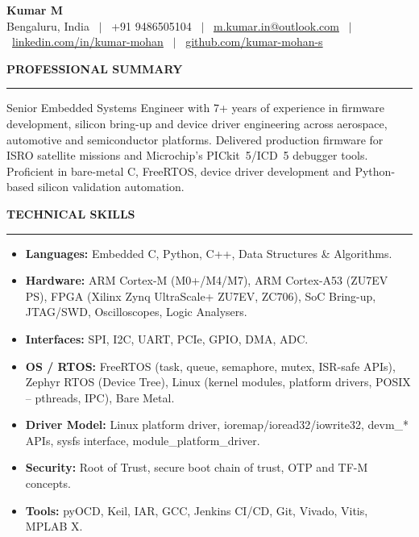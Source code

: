 \documentclass[11pt,a4paper]{article}
\newcommand{\resumesection}[1]{
    \vspace{1.2em} 
    {\large \textbf{\uppercase{#1}}}
    \vspace{0.2em}
    \hrule
    \vspace{0.6em} 
}
\begin{document}
\begin{center}
    {\Large \textbf{Kumar M}} \\ \vspace{0.4em}
    \small{Bengaluru, India \ $\vert$ \ +91 9486505104 \ $\vert$ \
    \href{mailto:m.kumar.in@outlook.com}{m.kumar.in@outlook.com} \ $\vert$ \
    \href{https://www.linkedin.com/in/kumar-mohan}{linkedin.com/in/kumar-mohan} \ $\vert$ \
    \href{https://github.com/kumar-mohan-s}{github.com/kumar-mohan-s}}
\end{center}

\resumesection{Professional Summary}
Senior Embedded Systems Engineer with 7+ years of experience in firmware development, silicon bring-up and device driver engineering across aerospace, automotive and semiconductor platforms. Delivered production firmware for ISRO satellite missions and Microchip's PICkit~5/ICD~5 debugger tools. Proficient in bare-metal C, FreeRTOS, device driver development and Python-based silicon validation automation.

\resumesection{Technical Skills}
\begin{itemize}[leftmargin=1.5em, itemsep=2pt, topsep=0pt]
    \item \textbf{Languages:} Embedded C, Python, C++, Data Structures \& Algorithms.
    \item \textbf{Hardware:} ARM Cortex-M (M0+/M4/M7), ARM Cortex-A53 (ZU7EV PS), FPGA (Xilinx Zynq UltraScale+ ZU7EV, ZC706), SoC Bring-up, JTAG/SWD, Oscilloscopes, Logic Analysers.
    \item \textbf{Interfaces:} SPI, I2C, UART, PCIe, GPIO, DMA, ADC.
    \item \textbf{OS / RTOS:} FreeRTOS (task, queue, semaphore, mutex, ISR-safe APIs), Zephyr RTOS (Device Tree), Linux (kernel modules, platform drivers, POSIX -- pthreads, IPC), Bare Metal.
    \item \textbf{Driver Model:} Linux platform driver, ioremap/ioread32/iowrite32, devm\_* APIs, sysfs interface, module\_platform\_driver.
    \item \textbf{Security:} Root of Trust, secure boot chain of trust, OTP and TF-M concepts.
    \item \textbf{Tools:} pyOCD, Keil, IAR, GCC, Jenkins CI/CD, Git, Vivado, Vitis, MPLAB X.
\end{itemize}
\end{document}
